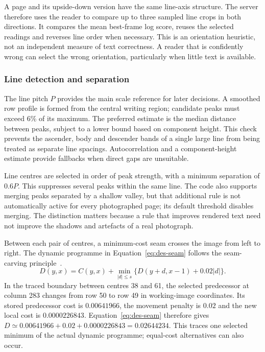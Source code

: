 A page and its upside-down version have the same line-axis structure. The server therefore uses the reader to compare up to three sampled line crops in both directions. It compares the mean best-frame log score, reuses the selected readings and reverses line order when necessary. This is an orientation heuristic, not an independent measure of text correctness. A reader that is confidently wrong can select the wrong orientation, particularly when little text is available.

\subsubsection{Line detection and separation}
The line pitch $P$ provides the main scale reference for later decisions. A smoothed row profile is formed from the central writing region; candidate peaks must exceed 6\% of its maximum. The preferred estimate is the median distance between peaks, subject to a lower bound based on component height. This check prevents the ascender, body and descender bands of a single large line from being treated as separate line spacings. Autocorrelation and a component-height estimate provide fallbacks when direct gaps are unsuitable.


Line centres are selected in order of peak strength, with a minimum separation of $0.6P$. This suppresses several peaks within the same line. The code also supports merging peaks separated by a shallow valley, but that additional rule is not automatically active for every photographed page; its default threshold disables merging. The distinction matters because a rule that improves rendered text need not improve the shadows and artefacts of a real photograph.

Between each pair of centres, a minimum-cost seam crosses the image from left to right. The dynamic programme in Equation~\ref{eq:des-seam} follows the seam-carving principle~\cite[PDF p.~3, Sec.~3]{avidan2007}.
\begin{equation}
D(y,x)=C(y,x)+\min_{|d|\leq s}
\{D(y+d,x-1)+0.02|d|\}.
\label{eq:des-seam}
\end{equation}
In the traced boundary between centres 38 and 61, the selected predecessor at column 283 changes from row 50 to row 49 in working-image coordinates. Its stored predecessor cost is $0.00641966$, the movement penalty is $0.02$ and the new local cost is $0.0000226843$. Equation~\ref{eq:des-seam} therefore gives $D\simeq0.00641966+0.02+0.0000226843=0.02644234$. This traces one selected minimum of the actual dynamic programme; equal-cost alternatives can also occur.

